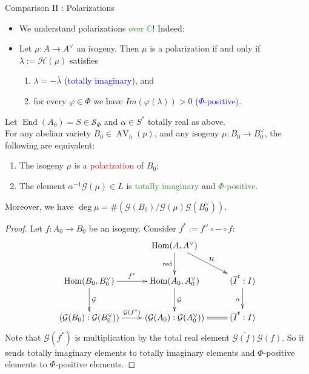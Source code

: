 \documentclass[usenames,dvipsnames,handout]{beamer}
\def\C{\mathbb{C}}
\DeclareMathOperator{\AV}{AV}
\DeclareMathOperator{\Hom}{Hom}
\DeclareMathOperator{\End}{End}
\newcommand{\cG}{\mathcal{G}}
\newcommand{\cH}{{\mathcal H}}
\newcommand{\vphi}{\varphi}
\newcommand{\red}[1]{\textcolor{red}{#1}}
\newcommand{\blue}[1]{\textcolor{blue}{#1}}
\newcommand{\green}[1]{\textcolor{ForestGreen}{#1}}
\begin{document}
\begin{frame}{ Comparison II : Polarizations }
    \begin{itemize}
     \item We understand polarizations \green{over $\C$}! Indeed:
	 \pause \item Let $\mu:A\to A^\vee$ an isogeny. Then $\mu$ is a polarization if and only if
	       $\lambda := \cH(\mu)$ satisfies
	       \begin{enumerate}
	       \item $\lambda = - \overline{\lambda}$ (\blue{totally imaginary}), and
	       \item for every $\vphi\in \Phi$ we have $Im(\vphi(\lambda))>0$  (\blue{$\Phi$-positive}).
           \end{enumerate}	  
	\end{itemize}
	\begin{theorem}["lift and spread"]
		Let $\End(A_0)=S\in\mathcal{S}_\Phi$ and $\alpha \in S^*$ totally real as above.\\
		\pause For any abelian variety $B_0 \in \AV_h(p)$, and any isogeny $\mu: B_0 \to B_0^{\vee}$, the following are equivalent:
		\begin{enumerate}
		\pause \item The isogeny $\mu$ is a \red{polarization} of $B_0$;
		\pause \item The element $\alpha^{-1} \cG(\mu) \in L$ is \green{totally imaginary} and \green{$\Phi$-positive}.
		\end{enumerate}
		\pause Moreover, we have $\deg \mu = \# \left( \cG(B_0) / \cG(\mu) \cG(B_0^\vee) \right)$.
	\end{theorem}
\end{frame}

\begin{frame}{  }
	\begin{proof}
	Let $f:A_0\to B_0$ be an isogeny. Consider $f^* := f^\vee \circ - \circ f$: 
	\pause \[\xymatrix{
	                                 & \Hom(A,A^\vee) \ar[d]_{\mathrm{red}} \ar[dr]^{\mathcal{H}} & \\
	 \Hom(B_0,B_0^\vee) \ar[r]^{f^*}\ar[d]^{\cG} & \Hom(A_0,A_0^\vee)\ar[d]^{\cG} & (\overline I^t : I) \ar[d]_{\alpha} \\
	 (\cG(B_0) : \cG(B_0^\vee))\ar[r]^{\cG(f^*)} & (\cG(A_0) : \cG(A_0^\vee)) & (\overline I^t : I)
	 \ar@{=}[l]
	}\]
	\pause Note that $\cG(f^*)$ is multiplication by the total real element $\overline{\cG(f)}\cG(f)$.
	\pause So it sends totally imaginary elements to totally imaginary elements and $\Phi$-positive elements to $\Phi$-positive elements.
	\end{proof} 
\end{frame}
\end{document}
